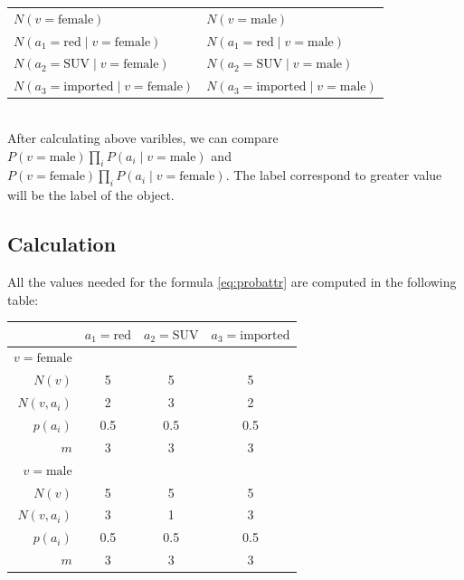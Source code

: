 \documentclass[a4paper]{article}
\begin{document}
		{
			\centering
			\begin{tabular}{ll}
				$N(v=\text{female})$ & $N(v=\text{male})$ \\
				$N(a_1=\text{red}\mid v=\text{female})$ &
				$N(a_1=\text{red}\mid v=\text{male})$ \\
				$N(a_2=\text{SUV}\mid v=\text{female})$ &
				$N(a_2=\text{SUV}\mid v=\text{male})$ \\
				$N(a_3=\text{imported}\mid v=\text{female})$ &
				$N(a_3=\text{imported}\mid v=\text{male})$
			\end{tabular}
		}\\

		After calculating above varibles, we can compare $P(v=\text{male})
		\prod_i{P(a_i \mid v=\text{male})}$ and \\ $P(v=\text{female})
		\prod_i{P(a_i \mid v=\text{female})}$. The label correspond to
		greater value will be the label of the object.


	\subsection{Calculation}

		All the values needed for the formula \eqref{eq:probattr} are
		computed in the following table:
		\begin{table}[H]
			\centering
			\begin{tabular}{@{}rSSS@{}}
				\toprule
									 & {$a_1=\text{red}$} & {$a_2=\text{SUV}$} &
									 {$a_3=\text{imported}$} \\
				\midrule
				$v=\text{female}$\\
				$N(v)$     & 5               & 5                & 5 \\
				$N(v,a_i)$ & 2               & 3                & 2 \\
				$p(a_i)$   & 0.5             & 0.5              & 0.5 \\
				$m$        & 3               & 3                & 3 \\
				\midrule
				$v=\text{male}$ \\
				$N(v)$     & 5               & 5                & 5 \\
				$N(v,a_i)$ & 3               & 1                & 3 \\
				$p(a_i)$   & 0.5             & 0.5              & 0.5 \\
				$m$        & 3               & 3                & 3 \\
				\bottomrule
			\end{tabular}
		\end{table}
\end{document}
